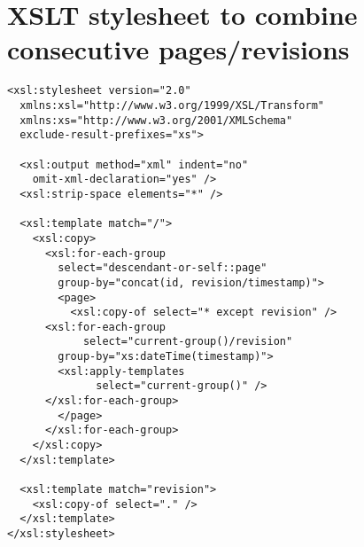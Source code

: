 \section{XSLT stylesheet to combine consecutive pages/revisions}\label{sec::xslt}
\begin{lstlisting}[caption=XSLT stylesheet to combine consecutive pages/revisions]
<xsl:stylesheet version="2.0" 
  xmlns:xsl="http://www.w3.org/1999/XSL/Transform" 
  xmlns:xs="http://www.w3.org/2001/XMLSchema"
  exclude-result-prefixes="xs">

  <xsl:output method="xml" indent="no" 
    omit-xml-declaration="yes" />
  <xsl:strip-space elements="*" />

  <xsl:template match="/">
    <xsl:copy>
      <xsl:for-each-group 
        select="descendant-or-self::page" 
        group-by="concat(id, revision/timestamp)">
        <page>
          <xsl:copy-of select="* except revision" />
	  <xsl:for-each-group 
            select="current-group()/revision"
	    group-by="xs:dateTime(timestamp)">
	    <xsl:apply-templates 
              select="current-group()" />
	  </xsl:for-each-group>
        </page>
      </xsl:for-each-group>
    </xsl:copy>
  </xsl:template>

  <xsl:template match="revision">
    <xsl:copy-of select="." />
  </xsl:template>
</xsl:stylesheet>
\end{lstlisting}
\label{combine}
